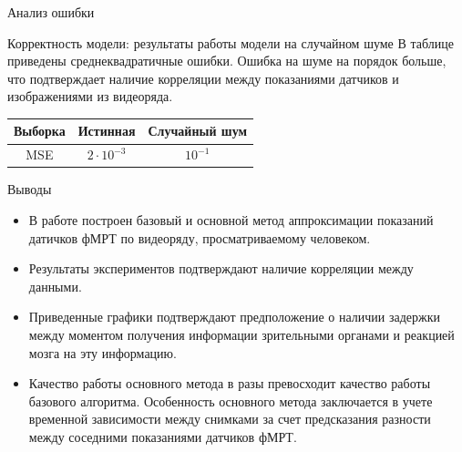 \documentclass[9pt,pdf]{beamer} %
\begin{document}
\begin{frame}{Анализ ошибки}
\begin{block}{Корректность модели: результаты работы модели на случайном шуме}
В таблице приведены среднеквадратичные ошибки.
Ошибка на шуме на порядок больше, что подтверждает наличие корреляции между показаниями датчиков и изображениями из видеоряда.
\begin{table}[h!]
    \centering
    \begin{tabular}{|c|c|c|}
        \hline
        Выборка	&	Истинная	&	Случайный шум \\ \hline \hline
        MSE		& 	$2 \cdot 10^{-3}$	 &		$10^{-1}$ \\ \hline
    \end{tabular}
    \label{table_3}
\end{table}
\end{block}
\end{frame}
\begin{frame}{Выводы}
\begin{itemize}
    \item В работе построен базовый и основной метод аппроксимации показаний датичков фМРТ по видеоряду, просматриваемому человеком. 
    \item Результаты экспериментов подтверждают наличие корреляции между данными.
    \item Приведенные графики подтверждают предположение о наличии задержки между моментом получения информации зрительными органами и реакцией мозга на эту информацию.
    \item Качество работы основного метода в разы превосходит качество работы базового алгоритма. 
    Особенность основного метода заключается в учете временной зависимости между снимками за счет предсказания разности между соседними показаниями датчиков фМРТ. 
\end{itemize}
\end{frame}
\end{document}

